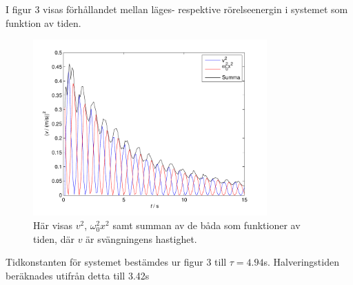 \documentclass[a4paper,10pt]{article}
\begin{document}
I figur 3 visas förhållandet mellan läges- respektive rörelseenergin i systemet som funktion av tiden.
\begin{figure}[H]
	\centering
	\includegraphics[width=0.8\textwidth]{../bilder/energigraf_uppg1.pdf}
	\caption{Här visas $v^2$, $\omega_0^2x^2$ samt summan av de båda som funktioner av tiden, där $v$ är svängningens hastighet.}
\end{figure}
Tidkonstanten för systemet bestämdes ur figur 3 till $\tau=4.94$s. Halveringstiden beräknades utifrån detta till 3.42s
\end{document}
